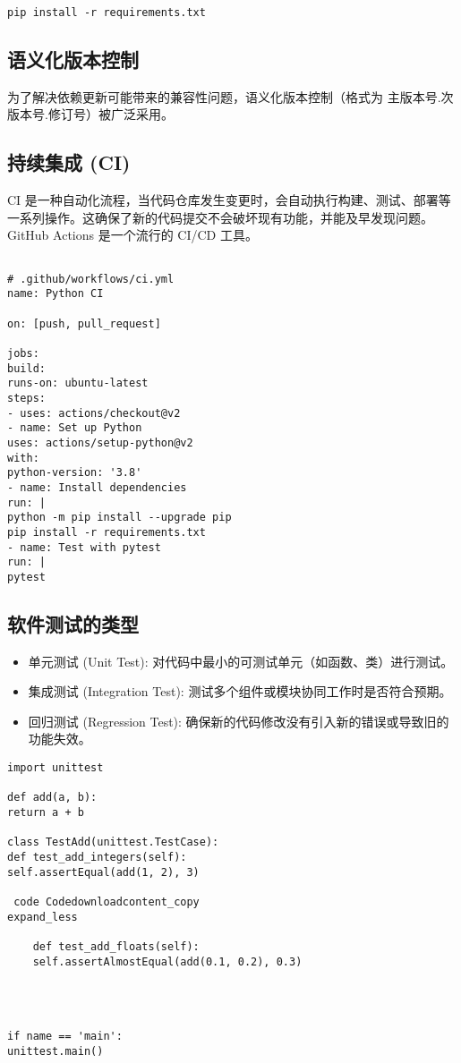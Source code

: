 \documentclass[UTF8]{gyh}
\begin{document}
\begin{lstlisting}
pip install -r requirements.txt
\end{lstlisting}

\subsection{语义化版本控制}
为了解决依赖更新可能带来的兼容性问题，语义化版本控制（格式为 主版本号.次版本号.修订号）被广泛采用。

\subsection{持续集成 (CI)}
CI 是一种自动化流程，当代码仓库发生变更时，会自动执行构建、测试、部署等一系列操作。这确保了新的代码提交不会破坏现有功能，并能及早发现问题。GitHub Actions 是一个流行的 CI/CD 工具。

\begin{lstlisting}

# .github/workflows/ci.yml
name: Python CI

on: [push, pull_request]

jobs:
build:
runs-on: ubuntu-latest
steps:
- uses: actions/checkout@v2
- name: Set up Python
uses: actions/setup-python@v2
with:
python-version: '3.8'
- name: Install dependencies
run: |
python -m pip install --upgrade pip
pip install -r requirements.txt
- name: Test with pytest
run: |
pytest
\end{lstlisting}

\subsection{软件测试的类型}
\begin{itemize}
\item 单元测试 (Unit Test): 对代码中最小的可测试单元（如函数、类）进行测试。
\item 集成测试 (Integration Test): 测试多个组件或模块协同工作时是否符合预期。
\item 回归测试 (Regression Test): 确保新的代码修改没有引入新的错误或导致旧的功能失效。
\end{itemize}
\begin{lstlisting}
import unittest

def add(a, b):
return a + b

class TestAdd(unittest.TestCase):
def test_add_integers(self):
self.assertEqual(add(1, 2), 3)

 code Codedownloadcontent_copy
expand_less

    def test_add_floats(self):
    self.assertAlmostEqual(add(0.1, 0.2), 0.3)




if name == 'main':
unittest.main()
\end{lstlisting}
\end{document}
